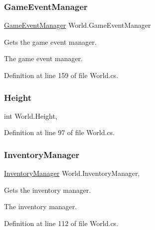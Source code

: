 \subsubsection{\texorpdfstring{Game\+Event\+Manager}{GameEventManager}}
{\footnotesize\ttfamily \hyperlink{class_game_event_manager}{Game\+Event\+Manager} World.\+Game\+Event\+Manager\hspace{0.3cm}{\ttfamily [get]}}



Gets the game event manager. 

The game event manager.

Definition at line 159 of file World.\+cs.

\mbox{\label{class_world_ac3b5695035eeab526a054329773366fc}} 
\subsubsection{\texorpdfstring{Height}{Height}}
{\footnotesize\ttfamily int World.\+Height\hspace{0.3cm}{\ttfamily [get]}, {}}



Definition at line 97 of file World.\+cs.

\mbox{\label{class_world_aa0563c65b3aa81ff47b8a29ec9977b80}} 
\subsubsection{\texorpdfstring{Inventory\+Manager}{InventoryManager}}
{\footnotesize\ttfamily \hyperlink{class_inventory_manager}{Inventory\+Manager} World.\+Inventory\+Manager\hspace{0.3cm}{\ttfamily [get]}, {}}



Gets the inventory manager. 

The inventory manager.

Definition at line 112 of file World.\+cs.

\mbox{\label{class_world_af1d11ccb7ad9d16b10bf364d7d54dc9d}} 
